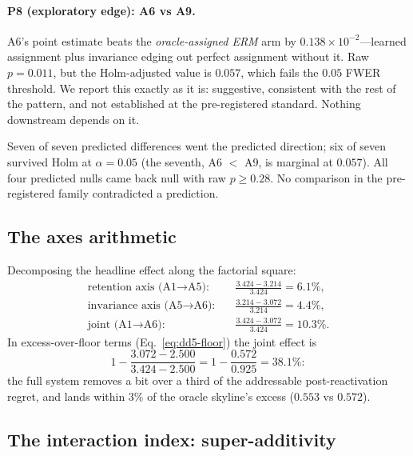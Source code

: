 \documentclass[11pt,a4paper]{article}
\theoremstyle{definition}
\theoremstyle{plain}
\begin{document}
\paragraph{P8 (exploratory edge): A6 vs A9.}
A6's point estimate beats the \emph{oracle-assigned ERM} arm by
$0.138\times 10^{-2}$---learned assignment plus invariance edging out
perfect assignment without it. Raw $p = 0.011$, but the Holm-adjusted value
is $0.057$, which fails the $0.05$ FWER threshold. We report this exactly
as it is: suggestive, consistent with the rest of the pattern, and not
established at the pre-registered standard. Nothing downstream depends on
it.

\begin{keypoint}
Seven of seven predicted differences went the predicted direction; six of
seven survived Holm at $\alpha=0.05$ (the seventh, A6 $<$ A9, is marginal
at $0.057$). All four predicted nulls came back null with raw
$p \ge 0.28$. No comparison in the pre-registered family contradicted a
prediction.
\end{keypoint}

\subsection{The axes arithmetic}
\label{sec:dd5-e1-axes}

Decomposing the headline effect along the factorial square:
\begin{align}
\text{retention axis (A1} \to \text{A5):}\quad
& \frac{3.424 - 3.214}{3.424} = 6.1\%, \label{eq:dd5-axis-ret}\\[2pt]
\text{invariance axis (A5} \to \text{A6):}\quad
& \frac{3.214 - 3.072}{3.214} = 4.4\%, \label{eq:dd5-axis-inv}\\[2pt]
\text{joint (A1} \to \text{A6):}\quad
& \frac{3.424 - 3.072}{3.424} = 10.3\%. \label{eq:dd5-axis-joint}
\end{align}
In excess-over-floor terms (Eq.~\eqref{eq:dd5-floor}) the joint effect is
\begin{equation}
1 - \frac{3.072 - 2.500}{3.424 - 2.500}
= 1 - \frac{0.572}{0.925} = 38.1\%:
\label{eq:dd5-excess}
\end{equation}
the full system removes a bit over a third of the addressable
post-reactivation regret, and lands within $3\%$ of the oracle skyline's
excess ($0.553$ vs $0.572$).

\subsection{The interaction index: super-additivity}
\label{sec:dd5-e1-interaction}
\end{document}
